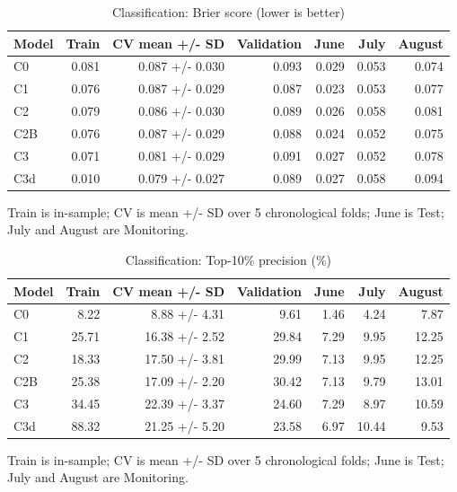 \begin{table}[htbp]
\centering
\small
\caption{Classification: Brier score (lower is better)}
\begin{tabular}{lrrrrrr}
\toprule
Model & Train & CV mean +/- SD & Validation & June & July & August \\
\midrule
C0 & 0.081 & 0.087 +/- 0.030 & 0.093 & 0.029 & 0.053 & 0.074 \\
C1 & 0.076 & 0.087 +/- 0.029 & 0.087 & 0.023 & 0.053 & 0.077 \\
C2 & 0.079 & 0.086 +/- 0.030 & 0.089 & 0.026 & 0.058 & 0.081 \\
C2B & 0.076 & 0.087 +/- 0.029 & 0.088 & 0.024 & 0.052 & 0.075 \\
C3 & 0.071 & 0.081 +/- 0.029 & 0.091 & 0.027 & 0.052 & 0.078 \\
C3d & 0.010 & 0.079 +/- 0.027 & 0.089 & 0.027 & 0.058 & 0.094 \\
\bottomrule
\end{tabular}
\par\smallskip\begin{minipage}{\linewidth}\footnotesize Train is in-sample; CV is mean +/- SD over 5 chronological folds; June is Test; July and August are Monitoring.\end{minipage}
\end{table}


\begin{table}[htbp]
\centering
\small
\caption{Classification: Top-10\% precision (\%)}
\begin{tabular}{lrrrrrr}
\toprule
Model & Train & CV mean +/- SD & Validation & June & July & August \\
\midrule
C0 & 8.22 & 8.88 +/- 4.31 & 9.61 & 1.46 & 4.24 & 7.87 \\
C1 & 25.71 & 16.38 +/- 2.52 & 29.84 & 7.29 & 9.95 & 12.25 \\
C2 & 18.33 & 17.50 +/- 3.81 & 29.99 & 7.13 & 9.95 & 12.25 \\
C2B & 25.38 & 17.09 +/- 2.20 & 30.42 & 7.13 & 9.79 & 13.01 \\
C3 & 34.45 & 22.39 +/- 3.37 & 24.60 & 7.29 & 8.97 & 10.59 \\
C3d & 88.32 & 21.25 +/- 5.20 & 23.58 & 6.97 & 10.44 & 9.53 \\
\bottomrule
\end{tabular}
\par\smallskip\begin{minipage}{\linewidth}\footnotesize Train is in-sample; CV is mean +/- SD over 5 chronological folds; June is Test; July and August are Monitoring.\end{minipage}
\end{table}



